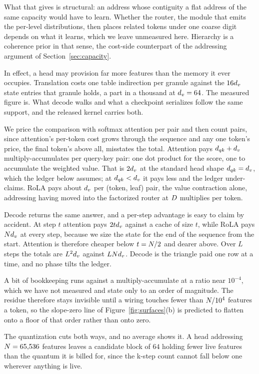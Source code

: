 What that gives is structural: an address whose contiguity a flat address of the same capacity would have to learn. Whether the router, the module that emits the per-level distributions, then places related tokens under one coarse digit depends on what it learns, which we leave unmeasured here. Hierarchy is a coherence prior in that sense, the cost-side counterpart of the addressing argument of Section~\ref{sec:capacity}.

In effect, a head may provision far more features than the memory it ever occupies. Translation costs one table indirection per granule against the $16d_v$ state entries that granule holds, a part in a thousand at $d_v = 64$. The measured figure is. What decode walks and what a checkpoint serializes follow the same support, and the released kernel carries both.

We price the comparison with softmax attention per pair and then count pairs, since attention's per-token cost grows through the sequence and any one token's price, the final token's above all, misstates the total. Attention pays $d_{qk} + d_v$ multiply-accumulates per query-key pair: one dot product for the score, one to accumulate the weighted value. That is $2d_v$ at the standard head shape $d_{qk} = d_v$, which the ledger below assumes; at $d_{qk} < d_v$ it pays less and the ledger under-claims. RoLA pays about $d_v$ per (token, leaf) pair, the value contraction alone, addressing having moved into the factorized router at $D$ multiplies per token.

Decode returns the same answer, and a per-step advantage is easy to claim by accident. At step $t$ attention pays $2td_v$ against a cache of size $t$, while RoLA pays $Nd_v$ at every step, because we size the state for the end of the sequence from the start. Attention is therefore cheaper below $t = N/2$ and dearer above. Over $L$ steps the totals are $L^2d_v$ against $LNd_v$. Decode is the triangle paid one row at a time, and no phase tilts the ledger.

A bit of bookkeeping runs against a multiply-accumulate at a ratio near $10^{-4}$, which we have not measured and state only to an order of magnitude. The residue therefore stays invisible until a wiring touches fewer than $N / 10^{4}$ features a token, so the slope-zero line of Figure~\ref{fig:surfaces}(b) is predicted to flatten onto a floor of that order rather than onto zero.

The quantization cuts both ways, and no average shows it. A head addressing $N = 65{,}536$ features leaves a candidate block of $64$ holding fewer live features than the quantum it is billed for, since the k-step count cannot fall below one wherever anything is live.


